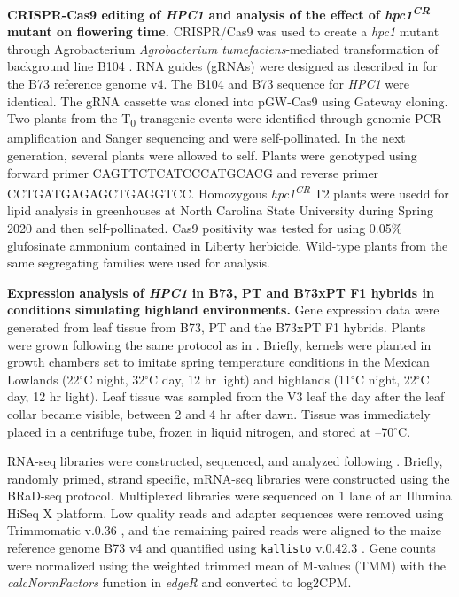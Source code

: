 \documentclass[9pt,twocolumn,twoside,lineno]{BioRxiv}
\begin{document}
\textbf{CRISPR-Cas9 editing of \textit{HPC1} and analysis of the effect of \textit{hpc1\textsuperscript{CR}} mutant on flowering time.}
CRISPR/Cas9 was used to create a \textit{hpc1} mutant through Agrobacterium \textit{Agrobacterium tumefaciens}-mediated transformation of background line B104 \cite{Wu2020-nq, Char2017-uk}. 
RNA guides (gRNAs) were designed as described in \cite{Brazelton2015-co} for the B73 reference genome v4. 
The B104 and B73 sequence for \textit{HPC1} were identical. 
The gRNA cassette was cloned into pGW-Cas9 using Gateway cloning. 
Two plants from the T\textsubscript{0} transgenic events were identified through genomic PCR amplification and Sanger sequencing and were self-pollinated. 
In the next generation, several plants were allowed to self.
Plants were genotyped using forward primer CAGTTCTCATCCCATGCACG and reverse primer CCTGATGAGAGCTGAGGTCC.
Homozygous \textit{hpc1\textsuperscript{CR}} T2 plants were  usedd for lipid analysis in greenhouses at  North Carolina State University during Spring 2020 and then self-pollinated. 
Cas9 positivity was tested for using 0.05\% glufosinate ammonium contained in Liberty herbicide. 
Wild-type plants from the same segregating families were used for analysis.

\textbf{Expression analysis of \textit{HPC1} in B73, PT and B73xPT F1 hybrids in conditions simulating highland environments.}
Gene expression data were generated from leaf tissue from B73, PT and the B73xPT F1 hybrids. 
Plants were grown following the same protocol as in \cite{Crow2020-gene}.
Briefly, kernels were planted in growth chambers set to imitate spring temperature conditions in the Mexican Lowlands (22$^{\circ}$C night, 32$^{\circ}$C day, 12 hr light) and highlands (11$^{\circ}$C night, 22$^{\circ}$C day, 12 hr light). 
Leaf tissue was sampled from the V3 leaf the day after the leaf collar became visible, between 2 and 4 hr after dawn. 
Tissue was immediately placed in a centrifuge tube, frozen in liquid nitrogen, and stored at --70$^{\circ}$C.

RNA-seq libraries were constructed, sequenced, and analyzed following \cite{Crow2020-gene}. 
Briefly, randomly primed, strand specific, mRNA-seq libraries were constructed using the BRaD-seq \cite{townsley2015brad} protocol.
Multiplexed libraries were sequenced on 1 lane of an Illumina HiSeq X platform. 
Low quality reads and adapter sequences were removed using Trimmomatic v.0.36 \cite{bolger2014trimmomatic}, and the remaining paired reads were aligned to the maize reference genome B73 v4 and quantified using \texttt{kallisto} v.0.42.3 \cite{bray2016near}. 
Gene counts were normalized using the weighted trimmed mean of M-values (TMM) with the \textit{calcNormFactors} function in \textit{edgeR} \cite{robinson2010edger} and converted to log2CPM.
\end{document}
